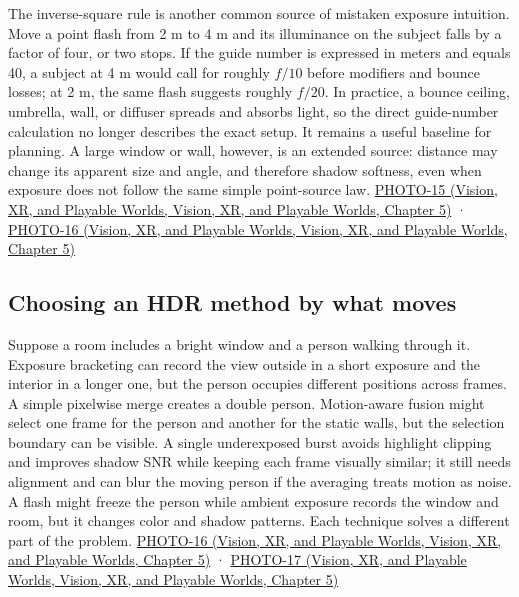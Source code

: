 The inverse-square rule is another common source of mistaken exposure intuition. Move a point flash from 2 m to 4 m and its illuminance on the subject falls by a factor of four, or two stops. If the guide number is expressed in meters and equals 40, a subject at 4 m would call for roughly \(f/10\) before modifiers and bounce losses; at 2 m, the same flash suggests roughly \(f/20\). In practice, a bounce ceiling, umbrella, wall, or diffuser spreads and absorbs light, so the direct guide-number calculation no longer describes the exact setup. It remains a useful baseline for planning. A large window or wall, however, is an extended source: distance may change its apparent size and angle, and therefore shadow softness, even when exposure does not follow the same simple point-source law. \href{../07-Vision-XR-and-Playable-Worlds/main.pdf\#nameddest=04-visual-computing-ii-ch036-photo-15---photography-session-15}{PHOTO-15 (Vision, XR, and Playable Worlds, Vision, XR, and Playable Worlds, Chapter 5)} · \href{../07-Vision-XR-and-Playable-Worlds/main.pdf\#nameddest=04-visual-computing-ii-ch036-photo-16---photography-session-16}{PHOTO-16 (Vision, XR, and Playable Worlds, Vision, XR, and Playable Worlds, Chapter 5)}

\subsection{Choosing an HDR method by what moves}\label{03-visual-computing-i-ch003-choosing-an-hdr-method-by-what-moves}

Suppose a room includes a bright window and a person walking through it. Exposure bracketing can record the view outside in a short exposure and the interior in a longer one, but the person occupies different positions across frames. A simple pixelwise merge creates a double person. Motion-aware fusion might select one frame for the person and another for the static walls, but the selection boundary can be visible. A single underexposed burst avoids highlight clipping and improves shadow SNR while keeping each frame visually similar; it still needs alignment and can blur the moving person if the averaging treats motion as noise. A flash might freeze the person while ambient exposure records the window and room, but it changes color and shadow patterns. Each technique solves a different part of the problem. \href{../07-Vision-XR-and-Playable-Worlds/main.pdf\#nameddest=04-visual-computing-ii-ch036-photo-16---photography-session-16}{PHOTO-16 (Vision, XR, and Playable Worlds, Vision, XR, and Playable Worlds, Chapter 5)} · \href{../07-Vision-XR-and-Playable-Worlds/main.pdf\#nameddest=04-visual-computing-ii-ch036-photo-17---photography-session-17}{PHOTO-17 (Vision, XR, and Playable Worlds, Vision, XR, and Playable Worlds, Chapter 5)}

